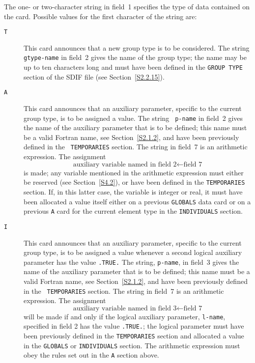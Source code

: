 \documentclass[a4paper]{article}
\newcommand{\itt}[1]{\item[\tt #1]}
\newcommand{\bdmath}{\begin{displaymath}}
\newcommand{\edmath}{\end{displaymath}}
\begin{document}
The one- or two-character string in field~1 specifies  the type of data
contained on the card.
Possible values for the  first character of the string are:
\begin{description}
\itt{T}
This card announces that  a new group  type
is  to be considered.  The
string {\tt gtype-name} in field~2 gives the name of the group type;
the name may be up  to ten characters  long and must have been defined
in  the  {\tt   GROUP  TYPE}
section    of   the SDIF    file   (see Section~\ref{S2.2.15}).

\itt{A}
This card  announces that an  auxiliary   parameter, specific  to  the
current  group type,
is   to be assigned   a  value.  The string {\tt
p-name} in field~2 gives the name of the auxiliary parameter that is
to  be  defined;  this  name  must be  a  valid  Fortran   name,
see Section~\ref{S2.1.2}, and have been previously defined in the {\tt
TEMPORARIES}
section.   The   string in field~7   is an  arithmetic expression. The
assignment
\bdmath
\mbox{auxiliary variable named in field~2} \leftarrow \mbox{field~7}
\edmath
is  made; any variable  mentioned in  the   arithmetic expression must
either be reserved (see  Section~\ref{S4.2}), or  have been defined in
the {\tt TEMPORARIES}
section. If, in this  latter case,  the variable
is integer or real, it must have been allocated  a value itself either
on a previous {\tt GLOBALS}
data card
or on a previous {\tt A}
card  for the current  element type
in the {\tt INDIVIDUALS}
section.

\itt{I}
This  card announces  that  an  auxiliary parameter,   specific to the
current  group type,
is to be  assigned  a value whenever  a  second
logical  auxiliary parameter has the value   {\tt  .TRUE.} The string,
{\tt p-name}, in field~3 gives the  name  of the  auxiliary parameter
that is to be defined; this  name  must be a  valid Fortran  name,
see
Section~\ref{S2.1.2}, and  have  been previously  defined in  the {\tt
TEMPORARIES}
section.   The string in  field~7   is  an arithmetic expression.  The
assignment
\bdmath
\mbox{auxiliary variable named in field~3} \leftarrow \mbox{field~7}
\edmath
will  be made  if and only if the  logical auxiliary  parameter,
{\tt l-name}, specified in field 2 has the value  {\tt .TRUE.}; the logical
parameter must have been previously  defined in  the {\tt TEMPORARIES}
section   and   allocated  a value  in    the  {\tt  GLOBALS}
or {\tt INDIVIDUALS}
section.  The  arithmetic expression must  obey the rules
set out in the {\tt A}
section above.


\end{description}
\end{document}

